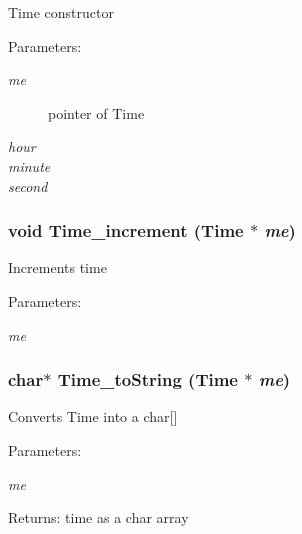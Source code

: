 Time constructor \begin{Desc}
\item[Parameters:]
\begin{description}
\item[{\em me}]pointer of Time \item[{\em hour}]\item[{\em minute}]\item[{\em second}]\end{description}
\end{Desc}
\hypertarget{group___t_i_m_e_a_p_i_g365e8c6d726ee14937fc0041c91c50aa}{
\subsubsection[{Time\_\-increment}]{\setlength{\rightskip}{0pt plus 5cm}void Time\_\-increment ({\bf Time} $\ast$ {\em me})}}
\label{group___t_i_m_e_a_p_i_g365e8c6d726ee14937fc0041c91c50aa}


Increments time \begin{Desc}
\item[Parameters:]
\begin{description}
\item[{\em me}]\end{description}
\end{Desc}
\hypertarget{group___t_i_m_e_a_p_i_gbb031a679ff73e5c3a6ee651233e9c2c}{
\subsubsection[{Time\_\-toString}]{\setlength{\rightskip}{0pt plus 5cm}char$\ast$ Time\_\-toString ({\bf Time} $\ast$ {\em me})}}
\label{group___t_i_m_e_a_p_i_gbb031a679ff73e5c3a6ee651233e9c2c}


Converts Time into a char\mbox{[}\mbox{]} \begin{Desc}
\item[Parameters:]
\begin{description}
\item[{\em me}]\end{description}
\end{Desc}
\begin{Desc}
\item[Returns:]time as a char array \end{Desc}
